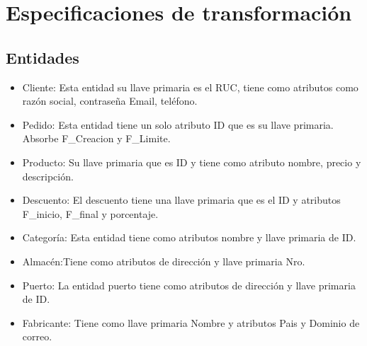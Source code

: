 \documentclass[10pt, a4paper,openany]{report}
\begin{document}





\section{Especificaciones de transformación} %
\label{sec:Especifiaciones de transformación}


\subsection{Entidades} %
\label{sub:Entidades}


\begin{itemize}
	\item Cliente: Esta entidad su llave primaria es el RUC, tiene como atributos como razón social, contraseña Email, teléfono.
	\item Pedido: Esta entidad tiene un solo atributo ID que es su llave primaria. Absorbe F\_Creacion y F\_Limite.
	\item Producto: Su llave primaria que es ID y tiene como atributo nombre, precio y descripción.
	\item Descuento: El descuento tiene una llave primaria que es el ID y atributos  F\_inicio, F\_final y porcentaje.
	\item Categoría: Esta entidad tiene como atributos nombre y llave primaria de ID.
	\item Almacén:Tiene como atributos de dirección y  llave primaria Nro.
	\item Puerto: La entidad puerto tiene como atributos de dirección y llave primaria de ID.

	\item Fabricante: Tiene como llave primaria Nombre y atributos Pais y Dominio de correo.
\end{itemize}
\end{document}
